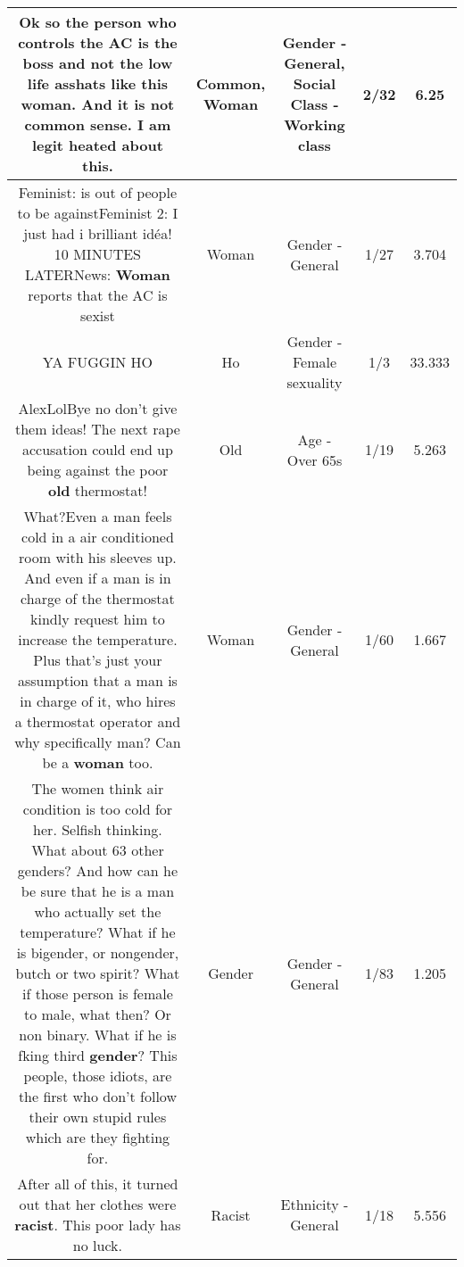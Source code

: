 \documentclass[11pt]{article}
\newlength\mylength
\begin{document}
\begin{center}
\begin{longtable}{|C{.65\mylength}|C{.30\mylength}|C{.12\mylength}|C{.12\mylength}|C{.12\mylength}|}
  \small Ok so the person who controls the AC is the boss and not the low life asshats like this \textbf{woman}. And it is not \textbf{common} sense. I am legit heated about this.\normalsize   & Common, Woman & Gender - General, Social Class - Working class & 2/32 & 6.25 \\  \hline
  \small Feminist: is out of people to be againstFeminist 2: I just had i brilliant idéa!   10 MINUTES LATERNews: \textbf{Woman} reports that the AC is sexist\normalsize   & Woman & Gender - General & 1/27 & 3.704 \\  \hline
  \small YA FUGGIN HO\normalsize   & Ho & Gender - Female sexuality & 1/3 & 33.333 \\  \hline
  \small AlexLolBye no don't give them ideas! The next rape accusation could end up being against the poor \textbf{old} thermostat!\normalsize   & Old & Age - Over 65s & 1/19 & 5.263 \\  \hline
  \small What?Even a man feels cold in a air conditioned room with his sleeves up. And even if a man is in charge of the thermostat kindly request him to increase the temperature. Plus that's just your assumption that a man is in charge of it, who hires a thermostat operator and why  specifically man? Can be a \textbf{woman} too.\normalsize   & Woman & Gender - General & 1/60 & 1.667 \\  \hline
  \small The women think air condition is too cold for her. Selfish thinking. What about 63 other genders? And how can he be sure that he is a man who actually set the temperature? What if he is bigender, or nongender, butch or two spirit? What if those person is female to male, what then? Or non binary. What if he is fking third \textbf{gender}? This people, those idiots, are the first who don't follow their own stupid rules which are they fighting for.\normalsize   & Gender & Gender - General & 1/83 & 1.205 \\  \hline
  \small After all of this, it turned out that her clothes were \textbf{racist}. This poor lady has no luck.\normalsize   & Racist & Ethnicity - General & 1/18 & 5.556 \\  \hline

\end{longtable}
\end{center}
\end{document}
